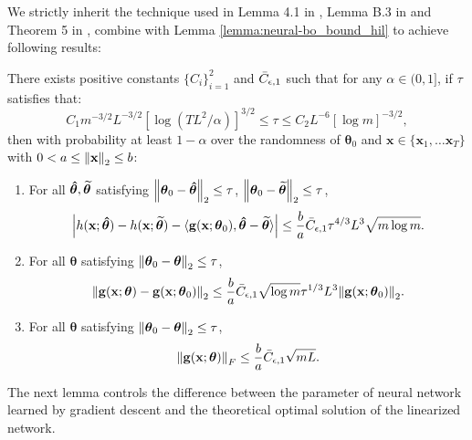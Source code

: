 We strictly inherit the technique used in Lemma 4.1 in \citet{cao2019generalization}, Lemma B.3 in \citet{cao2019generalization} and Theorem 5 in \citet{allen2019convergence}, combine with Lemma \ref{lemma:neural-bo_bound_hil} to achieve following results:
\begin{auxlemma}
\label{lemma:NTK_related_bounds}
There exists positive constants $\{C_i\}^2_{i=1}$ and $\Bar{C}_{\epsilon,1}$ such that for any $\alpha  \in (0,1]$, if $\tau$ satisfies that:
\[C_{1}m^{-3/2}L^{-3/2}\left[\log(T L^2/\alpha)\right]^{3/2}\leq\tau\leq C_{2}L^{-6}[\log m]^{-3/2},\] then with probability at least $1-\alpha$ over the randomness of $\boldsymbol{\theta}_0$ and $\mathbf{x} \in \{\mathbf{x}_1, \dots \mathbf{x}_T\}$ with $0<  a \le \norm{\mathbf{x}}_2 \le b$:
\begin{enumerate}
    \item For all  $\boldsymbol{\Hat{\theta}}, \boldsymbol{\widetilde{\theta}}$  satisfying $\norm{\boldsymbol{\theta}_0 -  \boldsymbol{\Hat{\theta}}}_2 \le \tau$, $\norm{\boldsymbol{\theta}_0 -  \boldsymbol{\widetilde{\theta}}}_2 \leq \tau$, 
    \[\left \lvert h(\mathbf{x};\boldsymbol{\Hat \theta}) - h(\mathbf{x}; \boldsymbol{\widetilde{\theta}}) - \langle \mathbf{g}(\mathbf{x}; \boldsymbol{\theta}_0), \boldsymbol{\Hat \theta} - \boldsymbol{\widetilde{\theta}} \rangle  \right\rvert  \leq  \frac{b}{a} \Bar{C}_{\epsilon,1}   \tau^{4/3}L^{3}\sqrt{m\log m}.\]
    \label{res:neural-bo_true_f_vs_linear}
    
    \item For all  $\boldsymbol{\theta}$  satisfying $\norm{\boldsymbol{\theta}_0 -  \boldsymbol{\theta}}_2 \le \tau$, 
    \[ \norm{\mathbf{g}(\mathbf{x}; \boldsymbol{\theta}) - \mathbf{g}(\mathbf{x}; \boldsymbol{\theta}_0)}_2 \leq \frac{b}{a} \Bar{C}_{\epsilon,1} \sqrt{\log m}\tau^{1/3}L^{3} \norm{\mathbf{g}(\mathbf{x};\boldsymbol{\theta}_0)}_2.\]
    
    \label{res:neural-bo_grad_diff_bound}
    
    \item For all  $\boldsymbol{\theta}$  satisfying $\norm{\boldsymbol{\theta}_0 -  \boldsymbol{\theta}}_2 \le \tau$, 
    \[\norm{\mathbf{g}(\mathbf{x};\boldsymbol{\theta})}_F \leq \frac{b}{a} \Bar{C}_{\epsilon,1} \sqrt{mL}.\] 
    
    \label{res:neural-bo_grad_bound}
\end{enumerate}
\end{auxlemma}
The next lemma controls the difference between the
parameter of neural network learned by gradient descent and the theoretical optimal solution of the linearized network. 

